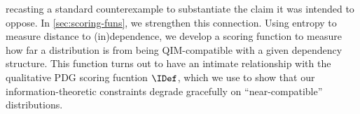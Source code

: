 recasting a standard counterexample to substantiate the claim it was intended to oppose.
In \cref{sec:scoring-funs}, we strengthen this connection. Using entropy to measure distance to (in)dependence, we develop a scoring function to measure how far a distribution is from being QIM-compatible with a given dependency 
structure.  
This function turns out to have an intimate relationship with the qualitative PDG scoring fucntion $\IDef$, which we use to 
show that our information-theoretic constraints degrade gracefully on ``near-compatible'' distributions.


